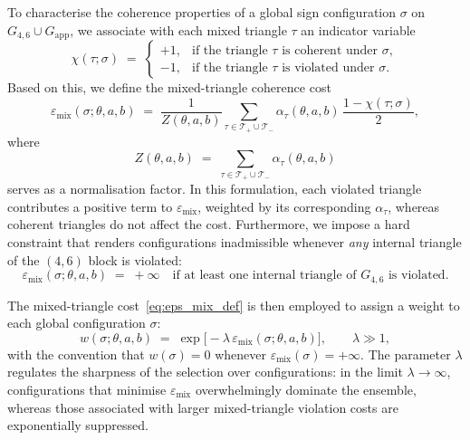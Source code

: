 \documentclass[11pt,a4paper]{article}
\numberwithin{equation}{section}
\begin{document}
To characterise the coherence properties of a global sign configuration $\sigma$ on $G_{4,6}\cup G_{\mathrm{app}}$, we associate with each mixed triangle $\tau$ an indicator variable
\begin{equation}
  \chi(\tau;\sigma) \;=\;
  \begin{cases}
    +1, & \text{if the triangle } \tau \text{ is coherent under } \sigma,\\
    -1, & \text{if the triangle } \tau \text{ is violated under } \sigma.
  \end{cases}
\end{equation}
Based on this, we define the mixed-triangle coherence cost
\begin{equation}
  \varepsilon_{\mathrm{mix}}(\sigma;\theta,a,b)
  \;=\;
  \frac{1}{Z(\theta,a,b)}
  \sum_{\tau\in\mathcal{T}_+\cup\mathcal{T}_-}
  \alpha_\tau(\theta,a,b)\,\frac{1-\chi(\tau;\sigma)}{2},
  \label{eq:eps_mix_def}
\end{equation}
where
\begin{equation}
  Z(\theta,a,b)
  \;=\;
  \sum_{\tau\in\mathcal{T}_+\cup\mathcal{T}_-}
  \alpha_\tau(\theta,a,b)
\end{equation}
serves as a normalisation factor. In this formulation, each violated triangle contributes a positive term to $\varepsilon_{\mathrm{mix}}$, weighted by its corresponding $\alpha_\tau$, whereas coherent triangles do not affect the cost. Furthermore, we impose a hard constraint that renders configurations inadmissible whenever \emph{any} internal triangle of the $(4,6)$ block is violated:
\begin{equation}
  \varepsilon_{\mathrm{mix}}(\sigma;\theta,a,b) \;=\; +\infty
  \quad \text{if at least one internal triangle of } G_{4,6} \text{ is violated}.
\end{equation}

The mixed-triangle cost~\eqref{eq:eps_mix_def} is then employed to assign a weight to each global configuration $\sigma$:
\begin{equation}
  w(\sigma;\theta,a,b)
  \;=\;
  \exp\!\Big[-\lambda\,\varepsilon_{\mathrm{mix}}(\sigma;\theta,a,b)\Big],
  \qquad
  \lambda \gg 1,
  \label{eq:weight_def}
\end{equation}
with the convention that $w(\sigma)=0$ whenever $\varepsilon_{\mathrm{mix}}(\sigma)=+\infty$. The parameter $\lambda$ regulates the sharpness of the selection over configurations: in the limit $\lambda\to\infty$, configurations that minimise $\varepsilon_{\mathrm{mix}}$ overwhelmingly dominate the ensemble, whereas those associated with larger mixed-triangle violation costs are exponentially suppressed.
\end{document}

